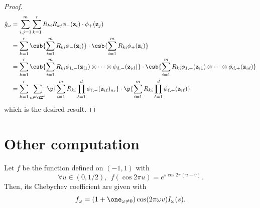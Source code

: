 \documentclass{article}
\begin{document}
\begin{proof}
  \begin{align*}
    \hat{g}_\omega
     & = \sum_{i, j = 1}^m \sum_{k = 1}^r R_{ki} R_{kj} \phi_- (\mathbf{z}_{i}) \cdot \phi_+ (\mathbf{z}_{j})                                                                                                                                                 \\
     & = \sum_{k = 1}^r \csb{\sum_{i = 1}^m R_{ki} \phi_- (\mathbf{z}_{i})} \cdot \csb{\sum_{i = 1}^m R_{ki} \phi_+ (\mathbf{z}_{i})}                                                                                                                         \\
     & = \sum_{k = 1}^r \csb{\sum_{i = 1}^m R_{ki} \phi_{1, -} (\mathbf{z}_{i 1}) \otimes \dots \otimes \phi_{d, -} (\mathbf{z}_{i d})} \cdot \csb{\sum_{i = 1}^m R_{ki} \phi_{1, +} (\mathbf{z}_{i 1}) \otimes \dots \otimes \phi_{d, +} (\mathbf{z}_{i d})} \\
     & = \sum_{k = 1}^r \sum_{n \in \ZZ^d} \p{\sum_{i = 1}^m R_{ki} \prod_{\ell = 1}^d \phi_{\ell, -} (\mathbf{z}_{i \ell})_{n_\ell}} \cdot \p{\sum_{i = 1}^m R_{ki} \prod_{\ell = 1}^d \phi_{\ell, +} (\mathbf{z}_{i \ell})}
  \end{align*}
  which is the desired result.
\end{proof}

\section{Other computation}

\begin{lemma}\label{lem:cheby-coeff-expfunc}
  Let $f$ be the function defined on $(-1, 1)$ with
  \begin{equation}
    \forall u \in (0,1/2), ~~ f(\cos 2\pi u) = e^{s \cos 2\pi (u - v)}.
  \end{equation}
  Then, its Chebychev coefficient are given with
  \begin{equation}
    f_\omega = (1 + \one_{\omega \neq 0}) \cos(2\pi \omega v) I_\omega(s).
  \end{equation}
\end{lemma}
\end{document}
